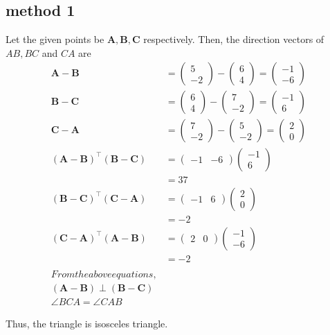 \documentclass[10pt, a4paper]{article}
\providecommand{\brak}[1]{\ensuremath{\left(#1\right)}}
\newcommand{\myvec}[1]{\ensuremath{\begin{pmatrix}#1\end{pmatrix}}}
\let\vec\mathbf
\begin{document}
 \subsection{method 1}Let the given points be $\vec{A}, \vec{B}, \vec{C}$ respectively. 
Then, the direction vectors of $AB, BC$ and $CA$ are
\begin{align}
\vec{A}-\vec{B}&=\myvec{5\\-2}-\myvec{6\\4}=\myvec{-1\\-6}\\
\vec{B}-\vec{C}&=\myvec{6\\4}-\myvec{7\\-2}=\myvec{-1\\6}\\
\vec{C}-\vec{A}&=\myvec{7\\-2}-\myvec{5\\-2}=\myvec{2\\0}\
\\
\brak{\vec{A} -\vec{B}}^{\top}\brak{\vec{B} -\vec{C}}&=  \myvec{-1 & -6}\myvec{-1 \\ 6}\\
&=37\\
\brak{\vec{B} -\vec{C}}^{\top}\brak{\vec{C} -\vec{A}}&=  \myvec{-1 & 6}\myvec{2 \\ 0}\\
&=-2\\
\brak{\vec{C} -\vec{A}}^{\top}\brak{\vec{A} -\vec{B}}&=  \myvec{2 & 0}\myvec{-1 \\ -6}\\
&=-2\\
\\
From  the above equations, 
\\
\brak{\vec{A} -\vec{B}}\perp \brak{\vec{B} -\vec{C}}\\
\angle BCA = \angle CAB  
\end{align}
 
Thus, the triangle is isosceles triangle.
\end{document}
